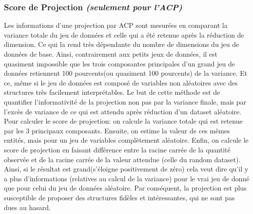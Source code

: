 \subsubsection{Score de Projection \textit{(seulement pour l'ACP)}}
Les informations d’une projection par ACP sont mesurées en comparant la variance totale du jeu de données et celle qui a été retenue après la réduction de dimension. Ce qui la rend très dépendante du nombre de dimensions du jeu de données de base.\newline
Ainsi, contrairement aux petits jeux de données, il est quasiment impossible que les trois composantes principales d’un grand jeu de données retiennent 100 pourcents(ou quasiment 100 pourcents) de la variance. Et ce, même si le jeu de données est composé de variables non aléatoires avec des structures très facilement interprétables.
\smallskip
Le but de cette méthode est de quantifier l’informativité de la projection non pas par la variance finale, mais par l'excès de variance de ce qui est attendu après réduction d’un dataset aléatoire.
Pour calculer le score de projection: on calcule la variance totale qui est retenue par les 3 principaux composants. Ensuite, on estime la valeur de ces mêmes entités, mais pour un jeu de variables complètement aléatoire.\newline
Enfin, on calcule le score de projection en faisant différence entre la racine carrée de la quantité observée et de la racine carrée de la valeur attendue (celle du random dataset).  Ainsi, si le résultat est grand(s’éloigne positivement de zéro) cela veut dire qu’il y a plus d’informations (relatives au calcul de la variance) pour le vrai jeu de donné que pour celui du jeu de données aléatoire.
Par conséquent, la projection est plus susceptible de proposer des structures fidèles et intéressantes, qui ne sont pas dues au hasard\cite{fontes2011ProjectionScore}.




